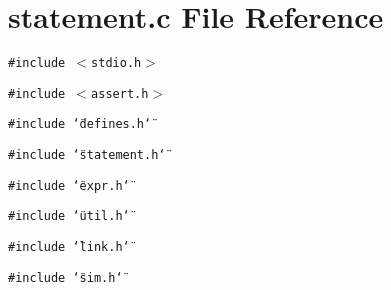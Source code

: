 \section{statement.c File Reference}
\label{statement_8c}
{\tt \#include $<$stdio.h$>$}\par
{\tt \#include $<$assert.h$>$}\par
{\tt \#include \char`\"{}defines.h\char`\"{}}\par
{\tt \#include \char`\"{}statement.h\char`\"{}}\par
{\tt \#include \char`\"{}expr.h\char`\"{}}\par
{\tt \#include \char`\"{}util.h\char`\"{}}\par
{\tt \#include \char`\"{}link.h\char`\"{}}\par
{\tt \#include \char`\"{}sim.h\char`\"{}}\par
